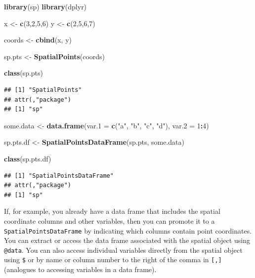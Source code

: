 \documentclass[
]{krantz}
\newenvironment{Shaded}{\begin{snugshade}}{\end{snugshade}}
\newcommand{\DataTypeTok}[1]{\textcolor[rgb]{0.13,0.29,0.53}{#1}}
\newcommand{\DecValTok}[1]{\textcolor[rgb]{0.00,0.00,0.81}{#1}}
\newcommand{\KeywordTok}[1]{\textcolor[rgb]{0.13,0.29,0.53}{\textbf{#1}}}
\newcommand{\NormalTok}[1]{#1}
\newcommand{\OperatorTok}[1]{\textcolor[rgb]{0.81,0.36,0.00}{\textbf{#1}}}
\newcommand{\StringTok}[1]{\textcolor[rgb]{0.31,0.60,0.02}{#1}}
\begin{document}
\begin{Shaded}
\begin{Highlighting}[]
\KeywordTok{library}\NormalTok{(sp)}
\KeywordTok{library}\NormalTok{(dplyr)}

\NormalTok{x \textless{}{-}}\StringTok{ }\KeywordTok{c}\NormalTok{(}\DecValTok{3}\NormalTok{,}\DecValTok{2}\NormalTok{,}\DecValTok{5}\NormalTok{,}\DecValTok{6}\NormalTok{)}
\NormalTok{y \textless{}{-}}\StringTok{ }\KeywordTok{c}\NormalTok{(}\DecValTok{2}\NormalTok{,}\DecValTok{5}\NormalTok{,}\DecValTok{6}\NormalTok{,}\DecValTok{7}\NormalTok{)}

\NormalTok{coords \textless{}{-}}\StringTok{ }\KeywordTok{cbind}\NormalTok{(x, y)}

\NormalTok{sp.pts \textless{}{-}}\StringTok{ }\KeywordTok{SpatialPoints}\NormalTok{(coords)}

\KeywordTok{class}\NormalTok{(sp.pts)}
\end{Highlighting}
\end{Shaded}

\begin{verbatim}
## [1] "SpatialPoints"
## attr(,"package")
## [1] "sp"
\end{verbatim}

\begin{Shaded}
\begin{Highlighting}[]
\NormalTok{some.data \textless{}{-}}\StringTok{ }\KeywordTok{data.frame}\NormalTok{(}\DataTypeTok{var.1 =} \KeywordTok{c}\NormalTok{(}\StringTok{"a"}\NormalTok{, }\StringTok{"b"}\NormalTok{, }\StringTok{"c"}\NormalTok{, }\StringTok{"d"}\NormalTok{), }\DataTypeTok{var.2 =} \DecValTok{1}\OperatorTok{:}\DecValTok{4}\NormalTok{)}

\NormalTok{sp.pts.df \textless{}{-}}\StringTok{ }\KeywordTok{SpatialPointsDataFrame}\NormalTok{(sp.pts, some.data)}

\KeywordTok{class}\NormalTok{(sp.pts.df)}
\end{Highlighting}
\end{Shaded}

\begin{verbatim}
## [1] "SpatialPointsDataFrame"
## attr(,"package")
## [1] "sp"
\end{verbatim}

If, for example, you already have a data frame that includes the spatial coordinate columns and other variables, then you can promote it to a \texttt{SpatialPointsDataFrame} by indicating which columns contain point coordinates. You can extract or access the data frame associated with the spatial object using \texttt{@data}. You can also access individual variables directly from the spatial object using \texttt{\$} or by name or column number to the right of the comma in \texttt{{[},{]}} (analogues to accessing variables in a data frame).
\end{document}
